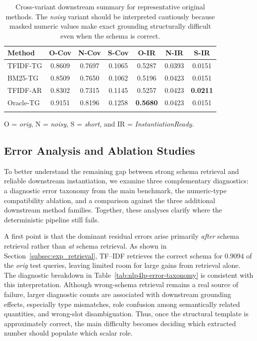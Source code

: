 \documentclass[pdflatex,sn-basic,Numbered]{sn-jnl}
\begin{document}
\begin{table}[t]
  \centering
  \caption{Cross-variant downstream summary for representative original methods. The \emph{noisy} variant should be interpreted cautiously because masked numeric values make exact grounding structurally difficult even when the schema is correct.}
  \label{tab:nlp4lp-downstream-variants}
  \small
  \setlength{\tabcolsep}{4.5pt}
  \begin{tabular}{lcccccc}
    \toprule
    Method & O-Cov & N-Cov & S-Cov & O-IR & N-IR & S-IR \\
    \midrule
    TFIDF-TG  & 0.8609 & 0.7697 & 0.1065 & 0.5287 & 0.0393 & 0.0151 \\
    BM25-TG   & 0.8509 & 0.7650 & 0.1062 & 0.5196 & 0.0423 & 0.0151 \\
    TFIDF-AR  & 0.8302 & 0.7315 & 0.1145 & 0.5257 & 0.0423 & \textbf{0.0211} \\
    Oracle-TG & 0.9151 & 0.8196 & 0.1258 & \textbf{0.5680} & 0.0423 & 0.0151 \\
    \botrule
  \end{tabular}

  \vspace{2mm}
  \raggedright
  \footnotesize
  O = \emph{orig}, N = \emph{noisy}, S = \emph{short}, and IR = \textit{InstantiationReady}.
\end{table}

\subsection{Error Analysis and Ablation Studies}
\label{subsec:exp_error}

To better understand the remaining gap between strong schema retrieval and reliable downstream instantiation, we examine three complementary diagnostics: a diagnostic error taxonomy from the main benchmark, the numeric-type compatibility ablation, and a comparison against the three additional downstream method families. Together, these analyses clarify where the deterministic pipeline still fails.

A first point is that the dominant residual errors arise primarily \emph{after} schema retrieval rather than \emph{at} schema retrieval. As shown in Section~\ref{subsec:exp_retrieval}, TF--IDF retrieves the correct schema for $0.9094$ of the \emph{orig} test queries, leaving limited room for large gains from retrieval alone. The diagnostic breakdown in Table~\ref{tab:nlp4lp-error-taxonomy} is consistent with this interpretation. Although wrong-schema retrieval remains a real source of failure, larger diagnostic counts are associated with downstream grounding effects, especially type mismatches, role confusion among semantically related quantities, and wrong-slot disambiguation. Thus, once the structural template is approximately correct, the main difficulty becomes deciding which extracted number should populate which scalar role.
\end{document}
